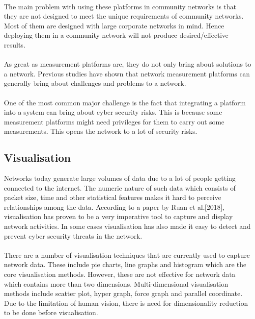 \paragraph{}
The main problem with using these platforms in community networks is that they are not designed to meet the unique requirements of community networks. Most of them are designed with large corporate networks in mind. Hence deploying them in a community network will not produce desired/effective results.
\paragraph{}
As great as measurement platforms are, they do not only bring about solutions to a network.
Previous studies have shown that network measurement platforms can generally bring about challenges and problems to a network\cite{7076582}.
\paragraph{}
One of the most common major challenge is the fact that integrating a platform into a system can bring about cyber security risks. This is because some measurement platforms might need privileges for them to carry out some measurements. This opens the network to a lot of security risks\cite{7076582}.

\subsection{Visualisation}
Networks today generate large volumes of data due to a lot of people getting connected to the internet. The numeric nature of such data which consists of packet size, time and other statistical features makes it hard to perceive relationships among the data\cite{Ruan2018}. According to a paper by Ruan et al.[2018], visualisation has proven to be a very imperative tool to capture and display network activities. In some cases visualisation has also made it easy to detect and prevent cyber security threats in the network\cite{inproceedings}.
\paragraph{}
There are a number of visualisation techniques that are currently used to capture network data. These include pie charts, line graphs and histogram which are the core visualisation methods. However, these are not effective for network data which contains more than two dimensions\cite{Ruan2018}. Multi-dimensional visualisation methods include scatter plot, hyper graph, force graph and parallel coordinate. Due to the limitation of human vision, there is need for dimensionality reduction to be done before visualisation\cite{Ruan2018}. 
